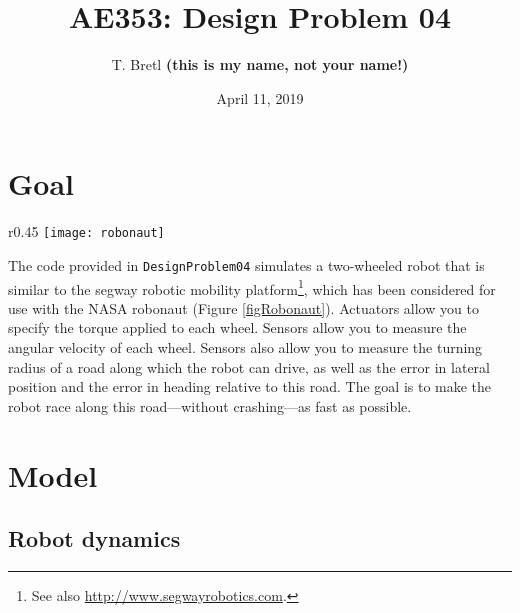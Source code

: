 \documentclass[12pt]{article}
\title{AE353: Design Problem 04}
\author{T. Bretl \textbf{(this is my name, not your name!)}}
\date{April 11, 2019}
\begin{document}
\maketitle


\section{Goal}

\begin{wrapfigure}[15]{r}{0.45\textwidth}
\vspace{-6em}%
\texttt{[image: robonaut]}
\vspace{-3em}
\caption{The NASA robonaut on top of a segway robotic mobility platform (\url{http://spaceflight.nasa.gov/gallery/images/station/eva/html/jsc2005e11678.html}). \label{figRobonaut}}
\end{wrapfigure}

The code provided in \lstinline!DesignProblem04! simulates a two-wheeled robot that is similar to the segway robotic mobility platform\footnote{See also \url{http://www.segwayrobotics.com}.}, which has been considered for use with the NASA robonaut (Figure \ref{figRobonaut}). Actuators allow you to specify the torque applied to each wheel. Sensors allow you to measure the angular velocity of each wheel. Sensors also allow you to measure the turning radius of a road along which the robot can drive, as well as the error in lateral position and the error in heading relative to this road. The goal is to make the robot race along this road---without crashing---as fast as possible.

\section{Model}

\subsection{Robot dynamics}
\label{secRobot}
\end{document}
